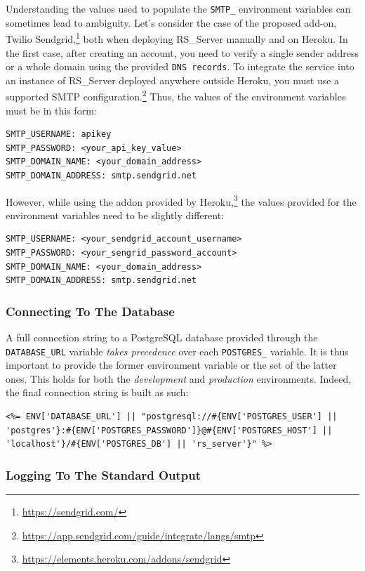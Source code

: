 \documentclass[a4paper, english]{article}
\newcommand{\rsserver}{RS\_Server\xspace}
\begin{document}
Understanding the values used to populate the \verb|SMTP_| environment variables can sometimes lead to ambiguity. Let's consider the case of the proposed add-on, Twilio Sendgrid,\footnote{\url{https://sendgrid.com/}} both when deploying \rsserver manually and on Heroku.
In the first case, after creating an account, you need to verify a single
sender address or a whole domain using the provided \verb|DNS records|. To integrate the service into an instance of \rsserver deployed anywhere outside Heroku, you must use a supported SMTP configuration.\footnote{\url{https://app.sendgrid.com/guide/integrate/langs/smtp}} Thus, the values of the environment variables must be in this form:
\begin{verbatim}
SMTP_USERNAME: apikey
SMTP_PASSWORD: <your_api_key_value>
SMTP_DOMAIN_NAME: <your_domain_address>
SMTP_DOMAIN_ADDRESS: smtp.sendgrid.net
\end{verbatim}
However, while using the addon provided by Heroku,\footnote{\url{https://elements.heroku.com/addons/sendgrid}} the values provided for the environment variables need to be slightly different:
\begin{verbatim}
SMTP_USERNAME: <your_sendgrid_account_username>
SMTP_PASSWORD: <your_sengrid_password_account>
SMTP_DOMAIN_NAME: <your_domain_address>
SMTP_DOMAIN_ADDRESS: smtp.sendgrid.net
\end{verbatim}

\subsubsection{Connecting To The Database}

A full connection string to a PostgreSQL database provided through the \verb|DATABASE_URL| variable \emph{takes precedence} over each \verb|POSTGRES_| variable. It is thus important to provide the former environment variable or the set of the latter ones. This holds for both the \emph{development} and \emph{production} environments. Indeed, the final connection string is built as such:
\begin{lstlisting}
<%= ENV['DATABASE_URL'] || "postgresql://#{ENV['POSTGRES_USER'] || 'postgres'}:#{ENV['POSTGRES_PASSWORD']}@#{ENV['POSTGRES_HOST'] || 'localhost'}/#{ENV['POSTGRES_DB'] || 'rs_server'}" %>
\end{lstlisting}

\subsubsection{Logging To The Standard Output}
\end{document}
